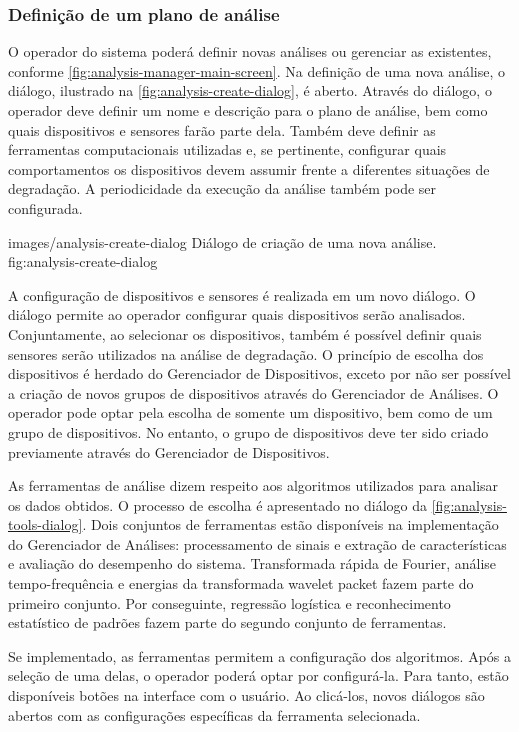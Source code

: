 \subsubsection{Definição de um plano de análise}

O operador do sistema poderá definir novas análises ou gerenciar as existentes, conforme
\cref{fig:analysis-manager-main-screen}. Na definição de uma nova análise, o diálogo, ilustrado na
\cref{fig:analysis-create-dialog}, é aberto. Através do diálogo, o operador deve definir um nome e
descrição para o plano de análise, bem como quais dispositivos e sensores farão parte dela. Também
deve definir as ferramentas computacionais utilizadas e, se pertinente, configurar quais
comportamentos os dispositivos devem assumir frente a diferentes situações de degradação. A
periodicidade da execução da análise também pode ser configurada.

  {images/analysis-create-dialog}
  {Diálogo de criação de uma nova análise.}
  {fig:analysis-create-dialog}

A configuração de dispositivos e sensores é realizada em um novo diálogo. O diálogo permite ao
operador configurar quais dispositivos serão analisados. Conjuntamente, ao selecionar os
dispositivos, também é possível definir quais sensores serão utilizados na análise de degradação. O
princípio de escolha dos dispositivos é herdado do Gerenciador de Dispositivos, exceto por não ser
possível a criação de novos grupos de dispositivos através do Gerenciador de Análises. O operador
pode optar pela escolha de somente um dispositivo, bem como de um grupo de dispositivos. No entanto,
o grupo de dispositivos deve ter sido criado previamente através do Gerenciador de Dispositivos.

As ferramentas de análise dizem respeito aos algoritmos utilizados para analisar os dados obtidos. O
processo de escolha é apresentado no diálogo da \cref{fig:analysis-tools-dialog}. Dois conjuntos de
ferramentas estão disponíveis na implementação do Gerenciador de Análises: processamento de sinais e
extração de características e avaliação do desempenho do sistema. Transformada rápida de Fourier,
análise tempo-frequência e energias da transformada wavelet packet fazem parte do primeiro conjunto.
Por conseguinte, regressão logística e reconhecimento estatístico de padrões fazem parte do segundo
conjunto de ferramentas.

Se implementado, as ferramentas permitem a configuração dos algoritmos. Após a seleção de uma delas,
o operador poderá optar por configurá-la. Para tanto, estão disponíveis botões na interface com o
usuário. Ao clicá-los, novos diálogos são abertos com as configurações específicas da ferramenta
selecionada.

